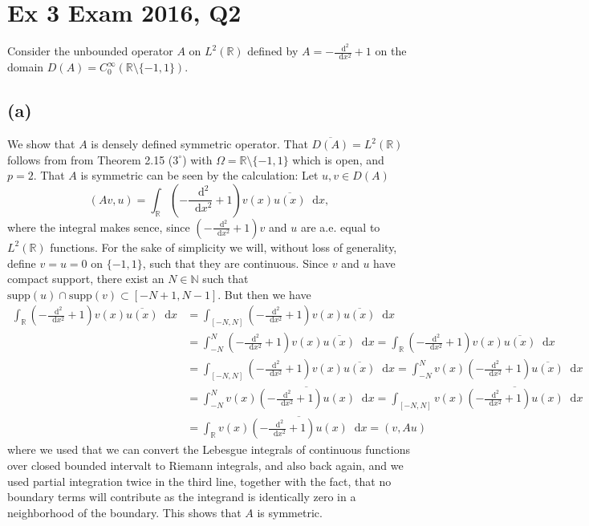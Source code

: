 \documentclass[a4paper,11pt]{article}
\newcommand{\supp}{\text{supp}}
\newcommand*\diff{\mathop{}\!\mathrm{d}}
\newcommand{\R}{\mathbb{R}}
\newcommand{\N}{\mathbb{N}}
\numberwithin{equation}{section}
\begin{document}
\section*{Ex 3 Exam 2016, Q2}
\setcounter{section}{3}
Consider the unbounded operator $ A $ on $ L^2(\R) $ defined by $ A=-\frac{\diff^2}{\diff x^2}+1 $ on the domain $ D(A)=C^\infty_0(\R\setminus\{-1,1\}) $.
\subsection*{(a)} 
We show that $ A $ is densely defined symmetric operator.
That $ \overline{D(A)}=L^2(\R) $ follows from from Theorem 2.15 ($ 3^\circ $) with $ \Omega=\R\setminus\{-1,1\} $ which is open, and $ p=2 $. That $ A $ is symmetric can be seen by the calculation: Let $ u,v\in D(A) $\begin{equation}
(Av,u)=\int_{\R} \left(-\frac{\diff^2}{\diff x^2}+1\right)v(x)\overline{u(x)} \diff x,
\end{equation}
where the integral makes sence, since $ \left(-\frac{\diff^2}{\diff x^2}+1\right)v $ and $ u $ are a.e. equal to $ L^2(\R) $ functions. For the sake of simplicity we will, without loss of generality, define $ v=u=0 $ on $ \{-1,1\} $, such that they are continuous. Since $ v $ and $ u $ have compact support, there exist an $ N\in \N $ such that $ \supp(u)\cap \supp(v)\subset [-N+1,N-1] $. But then we have \begin{equation}
\begin{aligned}
\int_{\R} \left(-\frac{\diff^2}{\diff x^2}+1\right)v(x)\overline{u(x)} \diff x&=\int_{[-N,N]} \left(-\frac{\diff^2}{\diff x^2}+1\right)v(x)\overline{u(x)}\diff x\\
&=\int_{-N}^{N}\left(-\frac{\diff^2}{\diff x^2}+1\right)v(x)\overline{u(x)} \diff x = \int_{\R} \left(-\frac{\diff^2}{\diff x^2}+1\right)v(x)\overline{u(x)} \diff x\\
&=\int_{[-N,N]} \left(-\frac{\diff^2}{\diff x^2}+1\right)v(x)\overline{u(x)}\diff x=\int_{-N}^{N}v(x)\left(-\frac{\diff^2}{\diff x^2}+1\right)\overline{u(x)} \diff x\\
&=\int_{-N}^{N}v(x)\overline{\left(-\frac{\diff^2}{\diff x^2}+1\right)u(x)} \diff x=\int_{[-N,N]}v(x)\overline{\left(-\frac{\diff^2}{\diff x^2}+1\right)u(x)} \diff x\\
&=\int_{\R}v(x)\overline{\left(-\frac{\diff^2}{\diff x^2}+1\right)u(x)} \diff x=(v,Au)
\end{aligned}
\end{equation}
where we used that we can convert the Lebesgue integrals of continuous functions over closed bounded intervalt to Riemann integrals, and also back again, and we used partial integration twice in the third line, together with the fact, that no boundary terms will contribute as the integrand is identically zero in a neighborhood of the boundary. This shows that $ A $ is symmetric.
\end{document}
